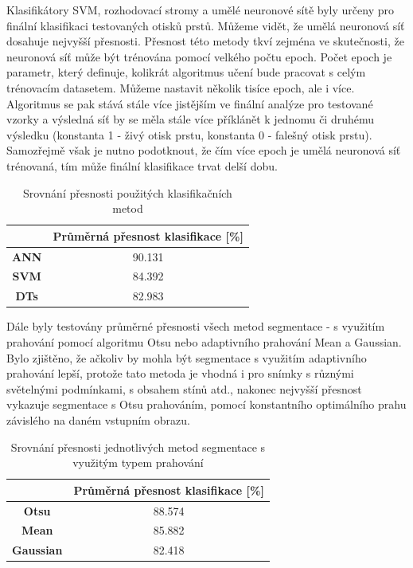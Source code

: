 Klasifikátory SVM, rozhodovací stromy a umělé neuronové sítě byly určeny pro finální klasifikaci testovaných otisků prstů. Můžeme vidět, že umělá neuronová síť dosahuje nejvyšší přesnosti. Přesnost této metody tkví zejména ve skutečnosti, že neuronová síť může být trénována pomocí velkého počtu epoch. Počet epoch je parametr, který definuje, kolikrát algoritmus učení bude pracovat s celým trénovacím datasetem. \cite{BatchEpochANN} Můžeme nastavit několik tisíce epoch, ale i více. Algoritmus se pak stává stále více jistějším ve finální analýze pro testované vzorky a výsledná síť by se měla stále více příklánět k jednomu či druhému výsledku (konstanta 1 - živý otisk prstu, konstanta 0 - falešný otisk prstu). Samozřejmě však je nutno podotknout, že čím více epoch je umělá neuronová síť trénovaná, tím může finální klasifikace trvat delší dobu. 

\capstartfalse
\begin{table}[!htbp]
\centering
\begin{tabular}{|c|c|}
\hline
                             & \textbf{Průměrná přesnost klasifikace {[}\%{]}} \\ \hline
\textbf{ANN} & 90.131                                         \\ \hline
\textbf{SVM}                 & 84.392                                         \\ \hline
\textbf{DTs}   & 82.983                                         \\ \hline
\end{tabular}
\caption{Srovnání přesnosti použitých klasifikačních metod}
\end{table}
\capstarttrue

Dále byly testovány průměrné přesnosti všech metod segmentace - s využitím prahování pomocí algoritmu Otsu nebo adaptivního prahování Mean a Gaussian. Bylo zjištěno, že ačkoliv by mohla být segmentace s využitím adaptivního prahování lepší, protože tato metoda je vhodná i pro snímky s různými světelnými podmínkami, s obsahem stínů atd., nakonec nejvyšší přesnost vykazuje segmentace s Otsu prahováním, pomocí konstantního optimálního prahu závislého na daném vstupním obrazu.

\capstartfalse
\begin{table}[!htbp]
\centering
\begin{tabular}{|c|c|}
\hline
                  & \textbf{Průměrná přesnost klasifikace {[}\%{]}} \\ \hline
\textbf{Otsu}     & 88.574                                         \\ \hline
\textbf{Mean}     & 85.882                                         \\ \hline
\textbf{Gaussian} & 82.418                                         \\ \hline
\end{tabular}
\caption{Srovnání přesnosti jednotlivých metod segmentace s využitým typem prahování}
\end{table}
\capstarttrue

